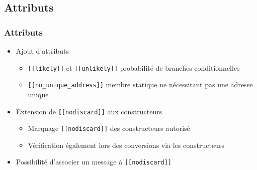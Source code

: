 \documentclass[C++.tex]{subfiles}
\begin{document}
\subsection*{Attributs}
\begin{frame}[fragile]
	\frametitle{Attributs}
	\begin{itemize}
		\item Ajout d'attributs
		\begin{itemize}
			\item \lstinline|[[likely]]| et \lstinline|[[unlikely]]| probabilité de branches conditionnelles


			\item \lstinline|[[no_unique_address]]| membre statique ne nécessitant pas une adresse unique

		\end{itemize}

		\item Extension de \lstinline|[[nodiscard]]| aux constructeurs
		\begin{itemize}
			\item Marquage \lstinline|[[nodiscard]]| des constructeurs autorisé


			\item Vérification également lors des conversions via les constructeurs

		\end{itemize}
		\item Possibilité d'associer un message à \lstinline|[[nodiscard]]|

	\end{itemize}
\end{frame}
\end{document}
